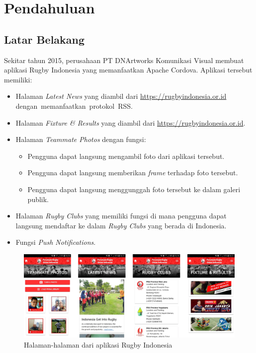 \chapter{Pendahuluan}
\label{chap:intro}
   
\section{Latar Belakang}
\label{sec:label}

Sekitar tahun 2015, perusahaan PT DNArtworks Komunikasi Visual membuat aplikasi Rugby Indonesia yang memanfaatkan Apache Cordova. Aplikasi tersebut memiliki: 
\begin{itemize}
    \item Halaman \textit{Latest News} yang diambil dari \url{https://rugbyindonesia.or.id} dengan~memanfaatkan~protokol~RSS.
    \item Halaman \textit{Fixture \& Results} yang diambil dari \url{https://rugbyindonesia.or.id}.
    \item Halaman \textit{Teammate Photos} dengan fungsi:
    \begin{itemize}
        \item Pengguna dapat langsung mengambil foto dari aplikasi tersebut.
        \item Pengguna dapat langsung memberikan \textit{frame} terhadap foto tersebut.
        \item Pengguna dapat langsung menggunggah foto tersebut ke dalam galeri publik.
    \end{itemize}
    \item Halaman \textit{Rugby Clubs} yang memiliki fungsi di mana pengguna dapat langsung mendaftar ke dalam \textit{Rugby Clubs} yang berada di Indonesia.
    \item Fungsi \textit{Push Notifications}.
\end{itemize}

\begin{figure} [!h]
    \centering
    \includegraphics[scale=0.725]{Gambar/Rugby-Indonesia-App-UI.png}
    \caption[Halaman aplikasi Rugby Indonesia]{Halaman-halaman dari aplikasi Rugby Indonesia}
    \label{fig:rugby-halaman-label}
\end{figure}

